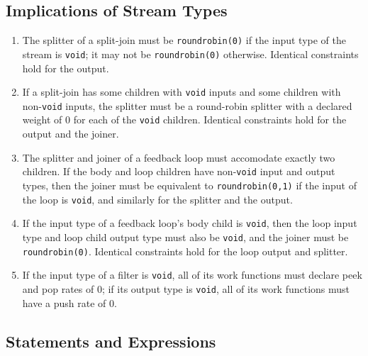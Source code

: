 \documentclass[11pt]{article}
\begin{document}
\subsection{Implications of Stream Types}

\begin{enumerate}
\item The splitter of a split-join must be
  \lstinline|roundrobin(0)| if the input type of the stream is
  \lstinline|void|; it may not be \lstinline|roundrobin(0)| otherwise.
  Identical constraints hold for the output.
\item If a split-join has some children with \lstinline|void| inputs and
  some children with non-\lstinline|void| inputs, the splitter must be
  a round-robin splitter with a declared weight of 0 for each of the
  \lstinline|void| children.  Identical constraints hold for the
  output and the joiner.
\item The splitter and joiner of a feedback loop must accomodate
  exactly two children.  If the body and loop children have
  non-\lstinline|void| input and output types, then the joiner must be
  equivalent to \lstinline|roundrobin(0,1)| if the input of the loop
  is \lstinline|void|, and similarly for the splitter and the output.
\item If the input type of a feedback loop's body child is
  \lstinline|void|, then the loop input type and loop child output
  type must also be \lstinline|void|, and the joiner must be
  \lstinline|roundrobin(0)|.  Identical constraints hold for the loop
  output and splitter.
\item If the input type of a filter is \lstinline|void|, all of its
  work functions must declare peek and pop rates of 0; if its output
  type is \lstinline|void|, all of its work functions must have a push
  rate of 0.
\end{enumerate}

\subsection{Statements and Expressions}
\end{document}
